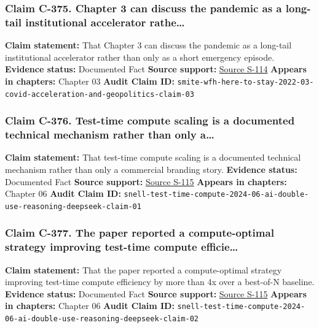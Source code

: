 \documentclass[
  american,
  11pt,
  letterpaper,
]{article}
\begin{document}
\subsubsection{Claim C-375. Chapter 3 can discuss the pandemic as a
long-tail institutional accelerator
rathe\ldots{}}\label{claim-c-375-chapter-3-can-discuss-the-pandemic-as-a-long-tail-institutional-accelerator-rathe}

\textbf{Claim statement:} That Chapter 3 can discuss the pandemic as a
long-tail institutional accelerator rather than only as a short
emergency episode. \textbf{Evidence status:} Documented Fact
\textbf{Source support:}
\hyperref[source-s-114-work-from-home-is-here-to-stay-call-for-flexibility-in-post-pandemic-work-policies]{Source
S-114} \textbf{Appears in chapters:} Chapter 03 \textbf{Audit Claim ID:}
\texttt{smite-wfh-here-to-stay-2022-03-covid-acceleration-and-geopolitics-claim-03}

\subsubsection{Claim C-376. Test-time compute scaling is a documented
technical mechanism rather than only
a\ldots{}}\label{claim-c-376-test-time-compute-scaling-is-a-documented-technical-mechanism-rather-than-only-a}

\textbf{Claim statement:} That test-time compute scaling is a documented
technical mechanism rather than only a commercial branding story.
\textbf{Evidence status:} Documented Fact \textbf{Source support:}
\hyperref[source-s-115-scaling-llm-test-time-compute-optimally-can-be-more-effective-than-scaling-model-parameters]{Source
S-115} \textbf{Appears in chapters:} Chapter 06 \textbf{Audit Claim ID:}
\texttt{snell-test-time-compute-2024-06-ai-double-use-reasoning-deepseek-claim-01}

\subsubsection{Claim C-377. The paper reported a compute-optimal
strategy improving test-time compute
efficie\ldots{}}\label{claim-c-377-the-paper-reported-a-compute-optimal-strategy-improving-test-time-compute-efficie}

\textbf{Claim statement:} That the paper reported a compute-optimal
strategy improving test-time compute efficiency by more than 4x over a
best-of-N baseline. \textbf{Evidence status:} Documented Fact
\textbf{Source support:}
\hyperref[source-s-115-scaling-llm-test-time-compute-optimally-can-be-more-effective-than-scaling-model-parameters]{Source
S-115} \textbf{Appears in chapters:} Chapter 06 \textbf{Audit Claim ID:}
\texttt{snell-test-time-compute-2024-06-ai-double-use-reasoning-deepseek-claim-02}
\end{document}
